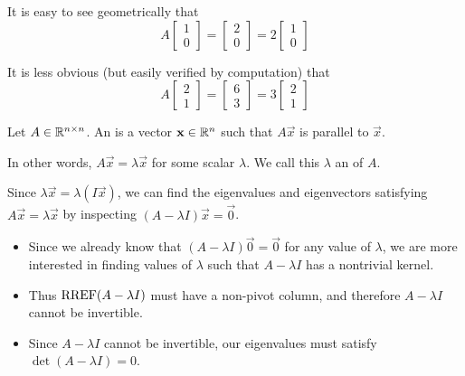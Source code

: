 \begin{applicationActivities}{3}{27}
\begin{observation}
\begin{center}
\end{center}
It is easy to see geometrically that  $$ A\begin{bmatrix}1 \\ 0 \end{bmatrix} = \begin{bmatrix}2 \\ 0 \end{bmatrix}= 2 \begin{bmatrix}1 \\ 0 \end{bmatrix}$$

It is less obvious (but easily verified by computation) that
$$A\begin{bmatrix} 2 \\ 1 \end{bmatrix} = \begin{bmatrix} 6 \\ 3 \end{bmatrix} = 3\begin{bmatrix} 2 \\ 1 \end{bmatrix}$$
\end{observation}

\begin{definition}Let $A \in \mathbb{R}^{n \times n}$.
An  is a vector $\mathbf{x} \in \mathbb{R}^n$ such that $A\vec{x}$ is parallel to $\vec{x}$.

In other words, $A\vec{x}=\lambda \vec{x}$ for some scalar $\lambda$.
We call this \(\lambda\) an  of \(A\).
\end{definition}

\begin{observation}
Since \(\lambda\vec x=\lambda (I\vec x)\), we can find the eigenvalues and
eigenvectors satisfying $A\vec{x}=\lambda \vec{x}$ by inspecting
$(A-\lambda I)\vec{x} = \vec0$.
\begin{itemize}
\item Since we already know that $(A-\lambda I)\vec0 = \vec0$
for any value of \(\lambda\),
we are more interested in finding values of $\lambda$ such that
$A-\lambda I$ has a nontrivial kernel.
\item Thus \(\operatorname{RREF}(A-\lambda I)\) must have a non-pivot column, and therefore
\(A-\lambda I\) cannot be invertible.
\item
Since \(A-\lambda I\) cannot be invertible, our eigenvalues must satisfy
\(\det(A-\lambda I)=0\).
\end{itemize}
\end{observation}


\end{applicationActivities}
